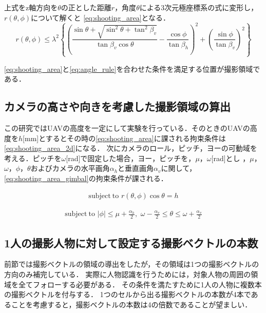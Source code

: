 \documentclass[autodetect-engine,dvipdfmx-if-dvi,ja=standard,a4j,jbase=11pt,magstyle=nomag*]{bxjsreport}
\begin{document}
上式をz軸方向を$\theta$の正とした距離$r$，角度$\theta$による$3$次元極座標系の式に変形し，$r(\theta, \phi)$について解くと
\cref{eq:shooting_area}となる．
\begin{equation}
r \left (\theta, \phi \right ) \le \lambda^2 \left \{ \left (\frac{\sin\theta+\sqrt{\sin^2\theta + \tan^2\beta_v}}{\tan\beta_v \cos\theta} 
- \frac{\cos\phi}{\tan\beta_h} \right )^2 + \left (\frac{\sin\phi}{\tan\beta_v} \right )^2 \right \}
\label{eq:shooting_area}
\end{equation}

\cref{eq:shooting_area}と\cref{eq:angle_rule}を合わせた条件を満足する位置が撮影領域である．

\subsection{カメラの高さや向きを考慮した撮影領域の算出}
この研究ではUAVの高度を一定にして実験を行っている．そのときのUAVの高度を$h$[mm]とするとその時の\cref{eq:shooting_area}に課される拘束条件は
\cref{eq:shooting_area_2d}になる．
次にカメラのロール，ピッチ，ヨーの可動域を考える．ピッチを$\omega$[rad]で固定した場合，ヨー，ピッチを，$\mu$，$\omega$[rad]とし
，$\mu$，$\omega$，$\phi$，$\theta$およびカメラの水平画角$\alpha_h$と垂直画角$\alpha_v$に関して，\cref{eq:shooting_area_gimbal}の拘束条件が課される．

\begin{equation}
    \begin{aligned}
    \mathrm{subject~to} \,\, r(\theta, \phi) \cos \theta = h
    \end{aligned}
\label{eq:shooting_area_2d}
\end{equation}

\begin{equation}
    \begin{aligned}
    \mathrm{subject~to} \,\, |\phi| \le \mu +  \frac{\alpha_h}{2}, \,\, \omega - \frac{\alpha_v}{2} \le \theta \le \omega + \frac{\alpha_v}{2}
    \end{aligned}
\label{eq:shooting_area_gimbal}
\end{equation}

\subsection{1人の撮影人物に対して設定する撮影ベクトルの本数}
前節では撮影ベクトルの領域の導出をしたが，その領域は1つの撮影ベクトルの方向のみ補完している．
実際に人物認識を行うためには，対象人物の周囲の領域を全てフォローする必要がある．
その条件を満たすために1人の人物に複数本の撮影ベクトルを付与する．
1つのセルから出る撮影ベクトルの本数が4本であることを考慮すると，撮影ベクトルの本数は4の倍数であることが望ましい．
\end{document}
